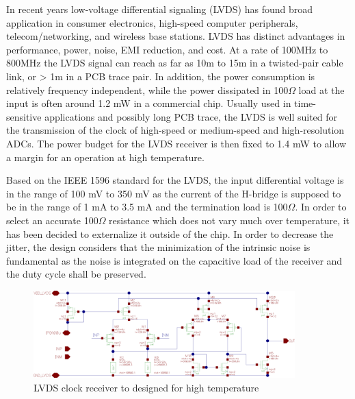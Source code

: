 In recent years low-voltage differential signaling (LVDS) has found broad application in consumer electronics, high-speed computer peripherals, telecom/networking, and wireless base stations. LVDS has distinct advantages in performance, power, noise, EMI reduction, and cost. At a rate of 100MHz to 800MHz the LVDS signal can reach as far as 10m to 15m in a twisted-pair cable link, or > 1m in a PCB trace pair. In addition, the power consumption is relatively frequency independent, while the power dissipated in 100$\Omega$ load at the input is often around 1.2 mW in a commercial chip. Usually used in time-sensitive applications and possibly long PCB trace, the LVDS is well suited for the transmission of the clock of high-speed or medium-speed and high-resolution ADCs. The power budget for the LVDS receiver is then fixed to 1.4 mW to allow a margin for an operation at high temperature.

Based on the IEEE 1596 standard for the LVDS, the input differential voltage is in the range of 100 mV to 350 mV as the current of the H-bridge is supposed to be in the range of 1 mA to 3.5 mA and the termination load is 100$\Omega$. In order to select an accurate 100$\Omega$ resistance which does not vary much over temperature, it has been decided to externalize it outside of the chip. In order to decrease the jitter, the design considers that the minimization of the intrinsic noise is fundamental as the noise is integrated on the capacitive load of the receiver and the duty cycle shall be preserved. 

\begin{figure}[htp]
    \centering
    \includegraphics[width=0.9\textwidth]{Chapter5/Figs/adc_chip/clk-recovery.png}
    \caption{LVDS clock receiver to designed for high temperature}
    \label{fig:lvds-receiver}
\end{figure}


